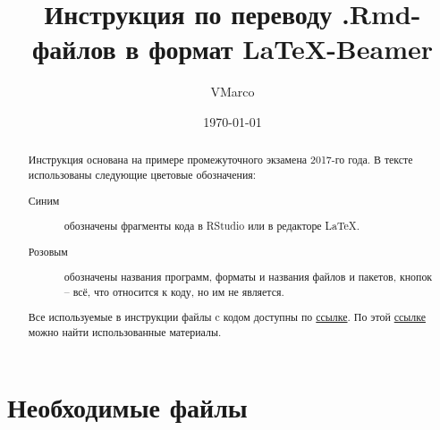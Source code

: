 \documentclass[11pt, a4paper]{extarticle}
\title{Инструкция по переводу .Rmd-файлов в формат \LaTeX-Beamer}
\author{VMarco}
\date{\today}
\newcommand{\code}[1]{{\color{blue} #1}}
\newcommand{\form}[1]{{\color{magenta} #1}}
\begin{document}
	
\maketitle

\renewcommand{\abstractname}{\vspace{-\baselineskip}}
\begin{abstract}
	Инструкция основана на примере промежуточного экзамена 2017-го года. В тексте использованы следующие цветовые обозначения:
	\begin{description}
		\item[\code{Синим}] обозначены фрагменты кода в RStudio или в редакторе \LaTeX.
		\item[\form{Розовым}] обозначены названия программ, форматы и названия файлов и пакетов, кнопок – всё, что относится к коду, но им не является.
	\end{description}
	Все используемые в инструкции файлы c кодом доступны по \href{https://github.com/V-Marco/rexamsconverter}{ссылке}. По этой \href{https://github.com/bdemeshev/probability_hse_exams/tree/master/tests}{ссылке} можно найти использованные материалы. 
\end{abstract}

\tableofcontents
\newpage

\section{Необходимые файлы}
\end{document}
